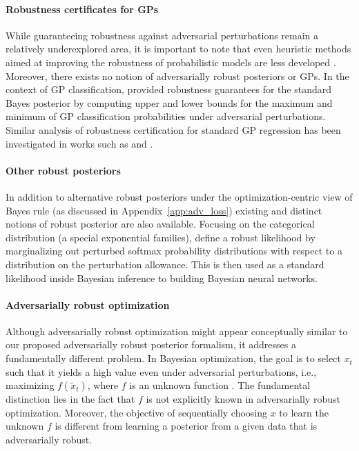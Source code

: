 \paragraph{Robustness certificates for GPs} 
While guaranteeing robustness against adversarial perturbations remain a relatively underexplored area, it is important to note that even heuristic methods aimed at improving the robustness of probabilistic models are less developed \citep{hernandez2011robust,bradshaw2017adversarial,grosse2018limitations}. Moreover, there exists no notion of adversarially robust posteriors or GPs. In the context of GP classification, \citet{blaas2020adversarial} provided robustness guarantees for the standard Bayes posterior by computing upper and lower bounds for the maximum and minimum of GP classification probabilities under adversarial perturbations. 
Similar analysis of robustness certification for standard GP regression has been investigated in works such as \citet{patane2022adversarial} and \citet{cardelli2019robustness}. %

\paragraph{Other robust posteriors} 
In addition to alternative robust posteriors under the optimization-centric view of Bayes rule (as discussed in Appendix~\ref{app:adv_loss}) existing and distinct notions of robust posterior are also available.
Focusing on the categorical distribution (a special exponential families), \citet{wicker2021bayesian} define a robust likelihood by marginalizing out perturbed softmax probability distributions with respect to a distribution on the perturbation allowance. 
This is then used as a standard likelihood inside Bayesian inference to building Bayesian neural networks.


\paragraph{Adversarially robust optimization} 
Although adversarially robust optimization might appear conceptually similar to our proposed adversarially robust posterior formalism, it addresses a fundamentally different problem. In Bayesian optimization, the goal is to select $x_t$ such that it yields a high value even under adversarial perturbations, i.e., maximizing $f(\tilde{x}_t)$, where $f$ is an unknown function \citep{bogunovic2018adversarially, kirschner2020distributionally}. The fundamental distinction lies in the fact that $f$ is not explicitly known in adversarially robust optimization. %
Moreover, the objective of sequentially choosing $x$ to learn the unknown $f$ is different from learning a posterior from a given data that is adversarially robust.